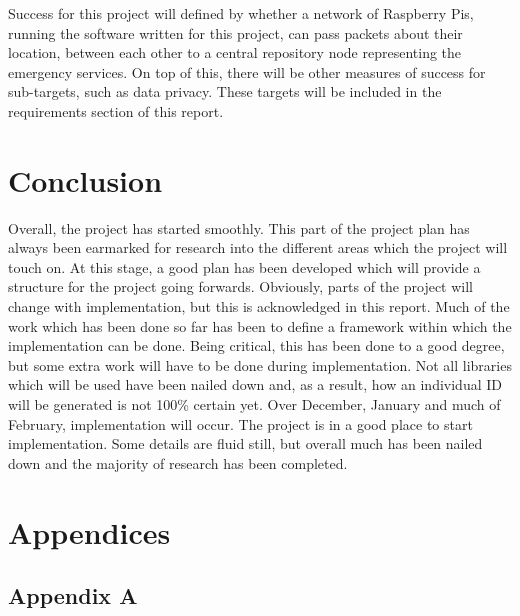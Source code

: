 \documentclass{report}
\begin{document}
Success for this project will defined by whether a network of Raspberry Pis, running the software written for this project, can pass packets about their location, between each other to a central repository node representing the emergency services. On top of this, there will be other measures of success for sub-targets, such as data privacy. These targets will be included in the requirements section of this report.


\chapter{Conclusion}
Overall, the project has started smoothly. This part of the project plan has always been earmarked for research into the different areas which the project will touch on. At this stage, a good plan has been developed which will provide a structure for the project going forwards. Obviously, parts of the project will change with implementation, but this is acknowledged in this report. Much of the work which has been done so far has been to define a framework within which the implementation can be done. Being critical, this has been done to a good degree, but some extra work will have to be done during implementation. Not all libraries which will be used have been nailed down and, as a result, how an individual ID will be generated is not 100\% certain yet. Over December, January and much of February, implementation will occur. The project is in a good place to start implementation. Some details are fluid still, but overall much has been nailed down and the majority of research has been completed.

\newpage
\appendix
\addappheadtotoc
\chapter*{Appendices}
\section*{Appendix A}



\newpage
{}
{}

\end{document}

